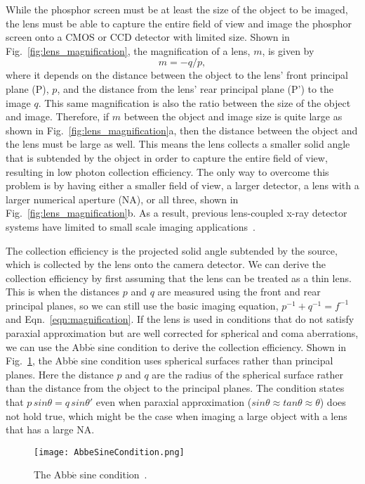 While the phosphor screen must be at least the size of the object to be imaged, the lens must be able to capture the entire field of view and image the phosphor screen onto a CMOS or CCD detector with limited size.  Shown in Fig.~\ref{fig:lens_magnification}, the magnification of a lens, $m$, is given by
%
\begin{equation}
m = -q/p,
\label{eqn:magnification}
\end{equation}
%
where it depends on the distance between the object to the lens' front principal plane (P), $p$, and the distance from the lens' rear principal plane (P') to the image $q$.  This same magnification is also the ratio between the size of the object and image.  Therefore, if $m$ between the object and image size is quite large as shown in Fig.~\ref{fig:lens_magnification}a, then the distance between the object and the lens must be large as well.  This means the lens collects a smaller solid angle that is subtended by the object in order to capture the entire field of view, resulting in low photon collection efficiency.  The only way to overcome this problem is by having either a smaller field of view, a larger detector, a lens with a larger numerical aperture (NA), or all three, shown in Fig.~\ref{fig:lens_magnification}b.  As a result, previous lens-coupled x-ray detector systems have limited to small scale imaging applications~\citep{lee2001, kim2005, tate2005, madden2006}.  

The collection efficiency is the projected solid angle subtended by the source, which is collected by the lens onto the camera detector.  We can derive the collection efficiency by first assuming that the lens can be treated as a thin lens.  This is when the distances $p$ and $q$ are measured using the front and rear principal planes, so we can still use the basic imaging equation, $p^{-1} + q^{-1} = f^{-1}$ and Eqn.~\ref{eqn:magnification}.  If the lens is used in conditions that do not satisfy paraxial approximation but are well corrected for spherical and coma aberrations, we can use the Abb$\acute{\mathrm{e}}$ sine condition to derive the collection efficiency.  Shown in Fig.~\ref{fig:Abbe}, the Abb$\acute{\mathrm{e}}$ sine condition uses spherical surfaces rather than principal planes.  Here the distance $p$ and $q$ are the radius of the spherical surface rather than the distance from the object to the principal planes.  The condition states that $p \, sin \theta = q \, sin \theta'$ even when paraxial approximation ($sin \theta \approx tan \theta \approx \theta $) does not hold true, which might be the case when imaging a large object with a lens that has a large NA.
%
\begin{figure}[h]
\texttt{[image: AbbeSineCondition.png]}
\caption{The Abb$\acute{\mathrm{e}}$ sine condition~\citep{Barrett2004}.}
\label{fig:Abbe}
\end{figure}

